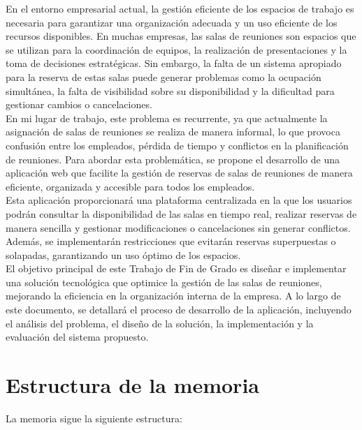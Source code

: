 
En el entorno empresarial actual, la gestión eficiente de los espacios de trabajo es necesaria para garantizar una organización adecuada y un uso eficiente de los recursos disponibles. En muchas empresas, las salas de reuniones son espacios que se utilizan para la coordinación de equipos, la realización de presentaciones y la toma de decisiones estratégicas. Sin embargo, la falta de un sistema apropiado para la reserva de estas salas puede generar problemas como la ocupación simultánea, la falta de visibilidad sobre su disponibilidad y la dificultad para gestionar cambios o cancelaciones.\\

En mi lugar de trabajo, este problema es recurrente, ya que actualmente la asignación de salas de reuniones se realiza de manera informal, lo que provoca confusión entre los empleados, pérdida de tiempo y conflictos en la planificación de reuniones. Para abordar esta problemática, se propone el desarrollo de una aplicación web que facilite la gestión de reservas de salas de reuniones de manera eficiente, organizada y accesible para todos los empleados.\\

Esta aplicación proporcionará una plataforma centralizada en la que los usuarios podrán consultar la disponibilidad de las salas en tiempo real, realizar reservas de manera sencilla y gestionar modificaciones o cancelaciones sin generar conflictos. Además, se implementarán restricciones que evitarán reservas superpuestas o solapadas, garantizando un uso óptimo de los espacios.\\

El objetivo principal de este Trabajo de Fin de Grado es diseñar e implementar una solución tecnológica que optimice la gestión de las salas de reuniones, mejorando la eficiencia en la organización interna de la empresa. A lo largo de este documento, se detallará el proceso de desarrollo de la aplicación, incluyendo el análisis del problema, el diseño de la solución, la implementación y la evaluación del sistema propuesto.

\section{Estructura de la memoria}\label{estructura-de-la-memoria}

La memoria sigue la siguiente estructura:

